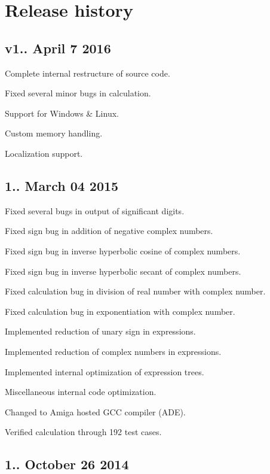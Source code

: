 \hypertarget{release_page_release_sec}{}\section{Release history}\label{release_page_release_sec}
\hypertarget{release_page_version160}{}\subsection{v1.. April 7 2016}\label{release_page_version160}

\begin{DoxyItemize}
\item Complete internal restructure of source code.
\item Fixed several minor bugs in calculation.
\item Support for Windows \& Linux.
\item Custom memory handling.
\item Localization support.
\end{DoxyItemize}\hypertarget{release_page_version154}{}\subsection{1.. March 04 2015}\label{release_page_version154}

\begin{DoxyItemize}
\item Fixed several bugs in output of significant digits.
\item Fixed sign bug in addition of negative complex numbers.
\item Fixed sign bug in inverse hyperbolic cosine of complex numbers.
\item Fixed sign bug in inverse hyperbolic secant of complex numbers.
\item Fixed calculation bug in division of real number with complex number.
\item Fixed calculation bug in exponentiation with complex number.
\item Implemented reduction of unary sign in expressions.
\item Implemented reduction of complex numbers in expressions.
\item Implemented internal optimization of expression trees.
\item Miscellaneous internal code optimization.
\item Changed to Amiga hosted G\+CC compiler (A\+DE).
\item Verified calculation through 192 test cases.
\end{DoxyItemize}\hypertarget{release_page_version153}{}\subsection{1.. October 26 2014}\label{release_page_version153}

